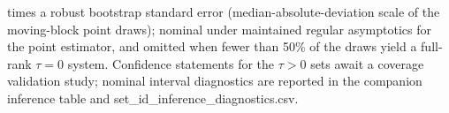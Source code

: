 \documentclass[11pt]{article}
\begin{document}
\begin{table}[!htbp]
\begin{threeparttable}
\begin{tablenotes}[flushleft]
times a robust bootstrap standard error (median-absolute-deviation scale of the moving-block point draws); nominal under maintained regular asymptotics for the point estimator, and omitted when fewer than 50\% of the draws yield a full-rank $\tau{=}0$ system. Confidence statements for the $\tau{>}0$ sets await a coverage validation study; nominal interval diagnostics are reported in the companion inference table and set\_id\_inference\_diagnostics.csv.
\end{tablenotes}
\end{threeparttable}
\end{table}
\end{document}
